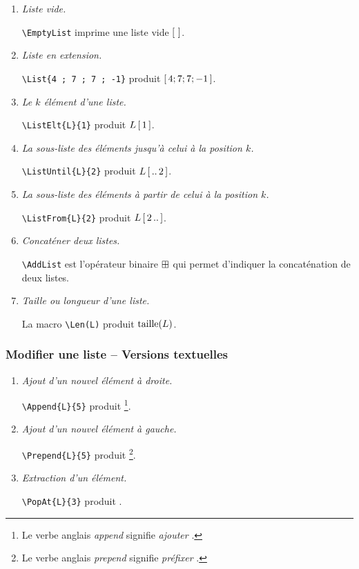 \documentclass[12pt,a4paper]{article}
\theoremstyle{definition}
\newcommand\myquote[1]{{\itshape \og #1 \fg}}
\begin{document}
\begin{enumerate}
	\item \textit{Liste vide.}

		  \verb+\EmptyList+ imprime une liste vide $\left[ \,  \, \right]$.


	\item \textit{Liste en extension.}

		  \verb+\List{4 ; 7 ; 7 ; -1}+ produit $\left[ \, 4 ; 7 ; 7 ; -1 \, \right]$.


	\item \textit{Le $k$\ieme{} élément d'une liste.}

		  \verb+\ListElt{L}{1}+ produit $L\left[ \, 1 \, \right]$.


	\item \textit{La sous-liste des éléments jusqu'à celui à la position $k$.}

		  \verb+\ListUntil{L}{2}+ produit $L\left[ \, ..\,2 \, \right]$.


	\item \textit{La sous-liste des éléments à partir de celui à la position $k$.}

		  \verb+\ListFrom{L}{2}+ produit $L\left[ \, 2\,.. \, \right]$.


	\item \textit{Concaténer deux listes.}

		  \verb+\AddList+ est l'opérateur binaire $\mathbin{\boxplus}$ qui permet d'indiquer la concaténation de deux listes.


	\item \textit{Taille ou longueur d'une liste.}

		  La macro \verb+\Len(L)+ produit $\operatorname{taille}(L)$.
\end{enumerate}



\subsubsection{Modifier une liste -- Versions textuelles}

\begin{enumerate}
	\item \textit{Ajout d'un nouvel élément à droite.}

	      \verb++ produit \myquote{\Append{L}{5}}
	      \footnote{
		       Le verbe anglais \myquote{append} signifie \myquote{ajouter}.
		  }.


	\item \textit{Ajout d'un nouvel élément à gauche.}

	      \verb++ produit \myquote{\Prepend{L}{5}}
	      \footnote{
		       Le verbe anglais \myquote{prepend} signifie \myquote{préfixer}.
		  }.


	\item \textit{Extraction d'un élément.}

	      \verb++ produit \myquote{\PopAt{L}{3}}.
\end{enumerate}
\end{document}

